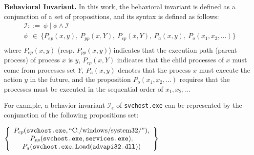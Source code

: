 \noindent
{\bf Behavioral Invariant.} In this work, the behavioral invariant is defined as a conjunction of a set of propositions, and its syntax is defined as follows:
\begin{align*}
 & \mathcal{I}  ::= \ \phi \mid \phi \wedge \mathcal{I} \\
 & \phi  \ \ \in \ \{ P_{ep}(x,y), \ P_{pp}(x,Y), \ P_{cp}(x,Y), \ P_{a}(x,y), \ P_{o}(x_1,x_2,\ldots)\} \\
\end{align*}
where $P_{ep}(x,y)$ (resp. $P_{pp}(x,y)$) indicates that the execution path (parent process) of process $x$ is $y$, $P_{cp}(x, Y)$ indicates that the child processes of $x$ must come from processes set $Y$, $P_{a}(x,y)$ denotes that the process $x$ must execute the action $y$ in the future, and the proposition $P_{o}(x_1,x_2,\ldots)$ requires that the processes must be executed in the sequential order of $x_1,x_2,\ldots$

For example, a behavior invariant $\mathcal{I}_e$ of \texttt{svchost.exe} can be represented by the conjunction of the following propositions set: 

\begin{center}
$ \left\{
\begin{array}{c}
P_{ep}(\texttt{svchost.exe}, \text{``C:/windows/system32/''}),\\
 P_{pp}(\texttt{svchost.exe}, \texttt{services.exe}),\\
 P_{a}(\texttt{svchost.exe}, \text{Load(\texttt{advapi32.dll})})
\end{array} \right\}$
\end{center}

